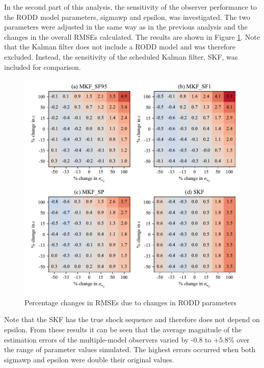 In the second part of this analysis, the sensitivity of the observer performance to the \gls{RODD} model parameters, \gls{sigmawp} and \gls{epsilon}, was investigated. The two parameters were adjusted in the same way as in the previous analysis and the changes in the overall \gls{RMSE}s calculated. The results are shown in Figure \ref{fig:grind1-obs-sim-sens-rod-y-est}. Note that the Kalman filter does not include a \gls{RODD} model and was therefore excluded. Instead, the sensitivity of the scheduled Kalman filter, SKF, was included for comparison.
\begin{figure}[htp]
	\centering
	\includegraphics[width=15cm]{images/rod_obs_sim_sens_rod_4obs_RMSE_y_est.pdf}
	\caption{Percentage changes in RMSEs due to changes in \gls{RODD} parameters}
	\label{fig:grind1-obs-sim-sens-rod-y-est}
\end{figure}
Note that the SKF has the true shock sequence and therefore does not depend on \gls{epsilon}. From these results it can be seen that the average magnitude of the estimation errors of the multiple-model observers varied by -0.8 to +5.8\% over the range of parameter values simulated. The highest errors occurred when both \gls{sigmawp} and \gls{epsilon} were double their original values.


